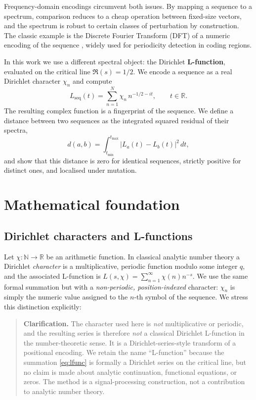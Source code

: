 \documentclass[12pt,a4paper]{article}
\begin{document}
Frequency-domain encodings circumvent both issues. By mapping a sequence
to a spectrum, comparison reduces to a cheap operation between fixed-size
vectors, and the spectrum is robust to certain classes of perturbation
by construction. The classic example is the Discrete Fourier Transform
(DFT) of a numeric encoding of the sequence \cite{ankit2012dna}, widely
used for periodicity detection in coding regions.

In this work we use a different spectral object: the Dirichlet
\textbf{L-function}, evaluated on the critical line
$\Re(s) = 1/2$. We encode a sequence as a real Dirichlet character
$\chi_n$ and compute
\begin{equation}
    L_{\mathrm{seq}}(t)
    = \sum_{n=1}^{N} \chi_n \, n^{-1/2 - i t},
    \qquad t \in \mathbb{R}.
    \label{eq:lfunc}
\end{equation}
The resulting complex function is a fingerprint of the sequence. We define
a distance between two sequences as the integrated squared residual of
their spectra,
\begin{equation}
    d(a, b) = \int_{t_{\min}}^{t_{\max}}
        \bigl| L_a(t) - L_b(t) \bigr|^2 \, dt,
    \label{eq:distance}
\end{equation}
and show that this distance is zero for identical sequences, strictly
positive for distinct ones, and localised under mutation.

\section{Mathematical foundation}
\label{sec:math}

\subsection{Dirichlet characters and L-functions}
\label{sec:dirichlet}

Let $\chi : \mathbb{N} \to \mathbb{R}$ be an arithmetic function. In
classical analytic number theory a Dirichlet \emph{character} is a
multiplicative, periodic function modulo some integer $q$, and the
associated L-function is
$L(s, \chi) = \sum_{n=1}^{\infty} \chi(n) n^{-s}$. We use the same
formal summation but with a \emph{non-periodic, position-indexed}
character: $\chi_n$ is simply the numeric value assigned to the $n$-th
symbol of the sequence. We stress this distinction explicitly:

\begin{quote}
\textbf{Clarification.} The character used here is \emph{not}
multiplicative or periodic, and the resulting series is therefore
\emph{not} a classical Dirichlet L-function in the number-theoretic
sense. It is a Dirichlet-series-style transform of a positional
encoding. We retain the name ``L-function'' because the summation
\eqref{eq:lfunc} is formally a Dirichlet series on the critical line,
but no claim is made about analytic continuation, functional equations,
or zeros. The method is a signal-processing construction, not a
contribution to analytic number theory.
\end{quote}
\end{document}
